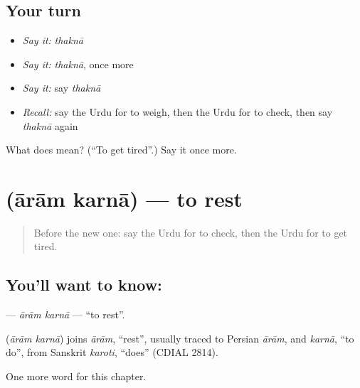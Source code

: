 \subsection*{Your turn}
\begin{itemize}
\raggedright
  \item \emph{Say it:} \emph{thaknā}
  \item \emph{Say it:} \emph{thaknā}, once more
  \item \emph{Say it:} say \emph{thaknā}
  \item \emph{Recall:} say the Urdu for to weigh, then the Urdu for to check, then say \emph{thaknā} again
\end{itemize}

\begin{tcolorbox}[breakable,colback=teal!4,colframe=teal!35!black,title={Before you move on}]
What does  mean? (\textquotedblleft{}To get tired\textquotedblright{}.) Say it once more.
\end{tcolorbox}
\section[\texorpdfstring{\ur{آرام} \ur{کرنا} (ārām karnā)}{آرام کرنا (ārām karnā)}]{  (ārām karnā) — to rest}

\label{lesson:UR-C182-aram-karna}



\begin{quote}
Before the new one: say the Urdu for to check, then the Urdu for to get tired.
\end{quote}

\subsection*{You'll want to know:  }
\textbf{ } — \emph{ārām karnā} — \textquotedblleft{}to rest\textquotedblright{}.

\begin{cousinweb}
\textbf{ } (\emph{ārām karnā}) joins \emph{ārām}, \textquotedblleft{}rest\textquotedblright{}, usually traced to Persian \emph{ārām}, and \emph{karnā}, \textquotedblleft{}to do\textquotedblright{}, from Sanskrit \emph{karoti}, \textquotedblleft{}does\textquotedblright{} (CDIAL 2814).
\end{cousinweb}

\begin{grammarlens}[title={What you've built}]
One more word for this chapter.
\end{grammarlens}

